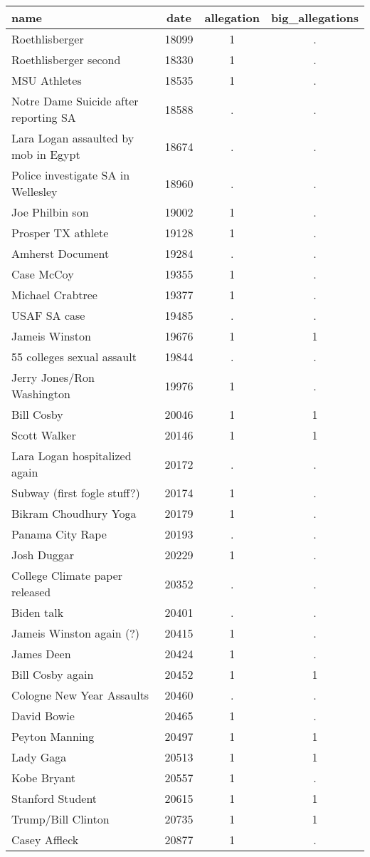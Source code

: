 \setlength{\pdfpagewidth}{8.5in} \setlength{\pdfpageheight}{11in}


\begin{tabular}{lccc} \hline
name & date & allegation & big\_allegations \\ \hline
Roethlisberger & 18099 & 1 & . \\
Roethlisberger second & 18330 & 1 & . \\
MSU Athletes & 18535 & 1 & . \\
Notre Dame Suicide after reporting SA  & 18588 & . & . \\
Lara Logan assaulted by mob in Egypt & 18674 & . & . \\
Police investigate SA in Wellesley & 18960 & . & . \\
Joe Philbin son & 19002 & 1 & . \\
Prosper TX athlete & 19128 & 1 & . \\
Amherst Document & 19284 & . & . \\
Case McCoy & 19355 & 1 & . \\
Michael Crabtree & 19377 & 1 & . \\
USAF SA case & 19485 & . & . \\
Jameis Winston & 19676 & 1 & 1 \\
55 colleges sexual assault & 19844 & . & . \\
Jerry Jones/Ron Washington & 19976 & 1 & . \\
Bill Cosby & 20046 & 1 & 1 \\
Scott Walker & 20146 & 1 & 1 \\
Lara Logan hospitalized again & 20172 & . & . \\
Subway (first fogle stuff?) & 20174 & 1 & . \\
Bikram Choudhury Yoga & 20179 & 1 & . \\
Panama City Rape & 20193 & . & . \\
Josh Duggar & 20229 & 1 & . \\
College Climate paper released & 20352 & . & . \\
Biden talk & 20401 & . & . \\
Jameis Winston again (?) & 20415 & 1 & . \\
James Deen & 20424 & 1 & . \\
Bill Cosby again & 20452 & 1 & 1 \\
Cologne New Year Assaults & 20460 & . & . \\
David Bowie & 20465 & 1 & . \\
Peyton Manning & 20497 & 1 & 1 \\
Lady Gaga & 20513 & 1 & 1 \\
Kobe Bryant & 20557 & 1 & . \\
Stanford Student & 20615 & 1 & 1 \\
Trump/Bill Clinton & 20735 & 1 & 1 \\
 Casey Affleck & 20877 & 1 & . \\ \hline
\end{tabular}

